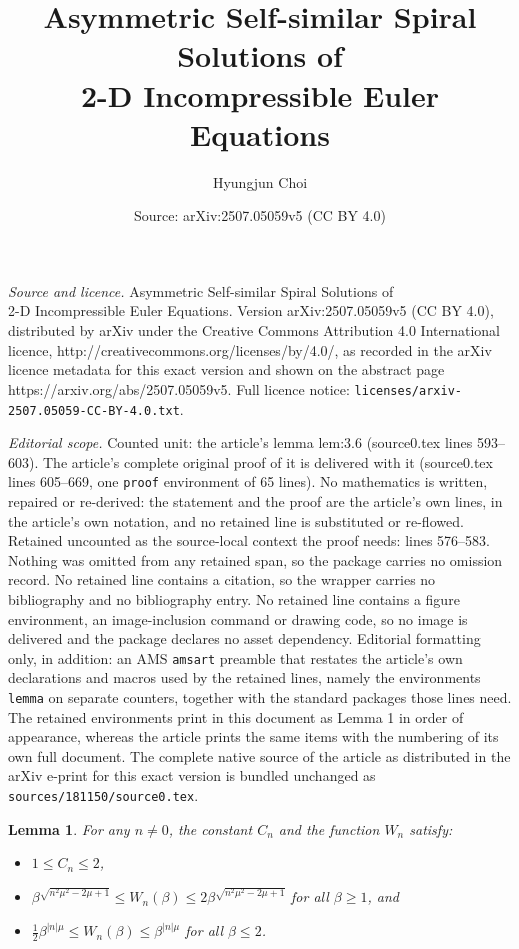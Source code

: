 \documentclass[10pt,a4paper]{amsart}
\title{Asymmetric Self-similar Spiral Solutions of\\2-D Incompressible Euler Equations}
\author{Hyungjun Choi}
\date{Source: arXiv:2507.05059v5 (CC BY 4.0)}
\newtheorem{lemma}{Lemma}
\begin{document}
\maketitle

\noindent\emph{Source and licence.} Asymmetric Self-similar Spiral Solutions of\\2-D Incompressible Euler Equations. Version arXiv:2507.05059v5 (CC BY 4.0), distributed by arXiv under the Creative Commons Attribution 4.0 International licence, http://creativecommons.org/licenses/by/4.0/, as recorded in the arXiv licence metadata for this exact version and shown on the abstract page https://arxiv.org/abs/2507.05059v5. Full licence notice: \texttt{licenses/arxiv-2507.05059-CC-BY-4.0.txt}.\par\smallskip

\noindent\textit{Editorial scope.} Counted unit: the article's lemma lem:3.6 (source0.tex lines 593--603). The article's complete original proof of it is delivered with it (source0.tex lines 605--669, one \texttt{proof} environment of 65 lines). No mathematics is written, repaired or re-derived: the statement and the proof are the article's own lines, in the article's own notation, and no retained line is substituted or re-flowed.  Retained uncounted as the source-local context the proof needs: lines 576--583.  Nothing was omitted from any retained span, so the package carries no omission record.  No retained line contains a citation, so the wrapper carries no bibliography and no bibliography entry.  No retained line contains a figure environment, an image-inclusion command or drawing code, so no image is delivered and the package declares no asset dependency.  Editorial formatting only, in addition: an AMS \texttt{amsart} preamble that restates the article's own declarations and macros used by the retained lines, namely the environments \texttt{lemma} on separate counters, together with the standard packages those lines need.  The retained environments print in this document as Lemma 1 in order of appearance, whereas the article prints the same items with the numbering of its own full document.  The complete native source of the article as distributed in the arXiv e-print for this exact version is bundled unchanged as \texttt{sources/181150/source0.tex}.
\begin{lemma} \label{lem:3.5}
For any $n\neq 0$, the constant $C_n$ and the function $W_n$ satisfy:
\vspace{-.5em}\begin{itemize}
	\item $1\leq C_n \leq 2$,
	\item $\beta^{\sqrt{n^2 \mu^2 - 2\mu + 1}} \leq W_n(\beta) \leq 2\beta^{\sqrt{n^2 \mu^2 - 2\mu + 1}}$ for all $\beta \geq 1$, and
	\item $\frac{1}{2} \beta^{|n|\mu} \leq W_n(\beta) \leq \beta^{|n|\mu}$ for all $\beta \leq 2$.
\end{itemize}
\end{lemma}
\end{document}
